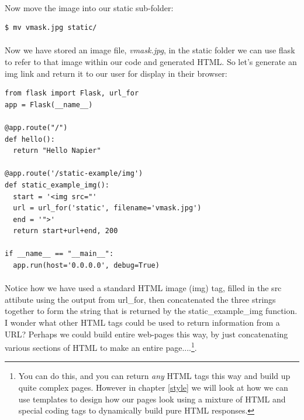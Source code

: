 \documentclass[12pt, a4paper, oneside]{book}
\begin{document}
\paragraph{} Now move the image into our static sub-folder:

\begin{lstlisting}[style=DOS]
    $ mv vmask.jpg static/
\end{lstlisting}

\paragraph{} Now we have stored an image file, \emph{vmask.jpg}, in the static folder we can use flask to refer to that image within our code and generated HTML. So let's generate an img link and return it to our user for display in their browser:

\begin{lstlisting}
from flask import Flask, url_for
app = Flask(__name__)

@app.route("/")
def hello():
  return "Hello Napier"

@app.route('/static-example/img')
def static_example_img():
  start = '<img src="'
  url = url_for('static', filename='vmask.jpg')
  end = '">'
  return start+url+end, 200

if __name__ == "__main__":
  app.run(host='0.0.0.0', debug=True)
\end{lstlisting}

\paragraph{} Notice how we have used a standard HTML image (img) tag, filled in the src attibute using the output from url\_for, then concatenated the three strings together to form the string that is returned by the static\_example\_img function. I wonder what other HTML tags could be used to return information from a URL? Perhaps we could build entire web-pages this way, by just concatenating various sections of HTML to make an entire page....\footnote{You can do this, and you can return \emph{any} HTML tags this way and build up quite complex pages. However in chapter \ref{style} we will look at how we can use templates to design how our pages look using a mixture of HTML and special coding tags to dynamically build pure HTML responses.}.
\end{document}
